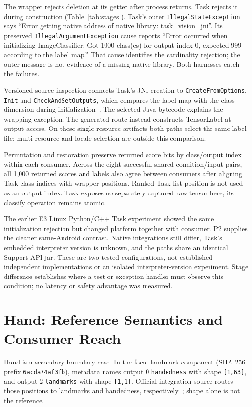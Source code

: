 \documentclass[10pt,conference]{IEEEtran}
\newcommand{\code}[1]{\texttt{#1}}
\begin{document}
The wrapper rejects deletion at its getter after process returns. Task rejects it during construction (Table~\ref{tab:stages}). Task's outer \code{IllegalStateException} says ``Error getting native address of native library: task\_vision\_jni''. Its preserved \code{IllegalArgumentException} cause reports ``Error occurred when initializing ImageClassifier: Got 1000 class(es) for output index 0, expected 999 according to the label map.'' That cause identifies the cardinality rejection; the outer message is not evidence of a missing native library. Both harnesses catch the failures.

Versioned source inspection connects Task's JNI creation to \code{CreateFromOptions}, \code{Init} and \code{CheckAndSetOutputs}, which compares the label map with the class dimension during initialization~\cite{task-classifier}. The selected Java bytecode explains the wrapping exception. The generated route instead constructs TensorLabel at output access. On these single-resource artifacts both paths select the same label file; multi-resource and locale selection are outside this comparison.

Permutation and restoration preserve returned score bits by class/output index within each consumer. Across the eight successful shared condition/input pairs, all 1,000 returned scores and labels also agree between consumers after aligning Task class indices with wrapper positions. Ranked Task list position is not used as an output index. Task exposes no separately captured raw tensor here; its classify operation remains atomic.

The earlier E3 Linux Python/C++ Task experiment showed the same initialization rejection but changed platform together with consumer. P2 supplies the cleaner same-Android contrast. Native integrations still differ, Task's embedded interpreter version is unknown, and the paths share an identical Support API jar. These are two tested configurations, not established independent implementations or an isolated interpreter-version experiment. Stage difference establishes where a test or exception handler must observe this condition; no latency or safety advantage was measured.

\section{Hand: Reference Semantics and Consumer Reach}
\label{sec:hand}
Hand is a secondary boundary case. In the focal landmark component (SHA-256 prefix \code{6acda74af3fb}), metadata names output 0 \code{handedness} with shape \code{[1,63]}, and output 2 \code{landmarks} with shape \code{[1,1]}. Official integration source routes those positions to landmarks and handedness, respectively~\cite{hand-graph}; shape alone is not the reference.
\end{document}
